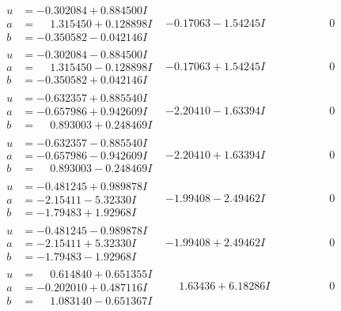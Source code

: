 \documentclass[1p]{elsarticle_modified}
\theoremstyle{definition}
\begin{document}
$$\begin{array}{c|c|c}
\begin{aligned}
u &= -0.302084 + 0.884500 I \\
a &= \phantom{-}1.315450 + 0.128898 I \\
b &= -0.350582 - 0.042146 I\end{aligned}
 & -0.17063 - 1.54245 I & \phantom{-0.000000 } 0 \\ \hline\begin{aligned}
u &= -0.302084 - 0.884500 I \\
a &= \phantom{-}1.315450 - 0.128898 I \\
b &= -0.350582 + 0.042146 I\end{aligned}
 & -0.17063 + 1.54245 I & \phantom{-0.000000 } 0 \\ \hline\begin{aligned}
u &= -0.632357 + 0.885540 I \\
a &= -0.657986 + 0.942609 I \\
b &= \phantom{-}0.893003 + 0.248469 I\end{aligned}
 & -2.20410 - 1.63394 I & \phantom{-0.000000 } 0 \\ \hline\begin{aligned}
u &= -0.632357 - 0.885540 I \\
a &= -0.657986 - 0.942609 I \\
b &= \phantom{-}0.893003 - 0.248469 I\end{aligned}
 & -2.20410 + 1.63394 I & \phantom{-0.000000 } 0 \\ \hline\begin{aligned}
u &= -0.481245 + 0.989878 I \\
a &= -2.15411 - 5.32330 I \\
b &= -1.79483 + 1.92968 I\end{aligned}
 & -1.99408 - 2.49462 I & \phantom{-0.000000 } 0 \\ \hline\begin{aligned}
u &= -0.481245 - 0.989878 I \\
a &= -2.15411 + 5.32330 I \\
b &= -1.79483 - 1.92968 I\end{aligned}
 & -1.99408 + 2.49462 I & \phantom{-0.000000 } 0 \\ \hline\begin{aligned}
u &= \phantom{-}0.614840 + 0.651355 I \\
a &= -0.202010 + 0.487116 I \\
b &= \phantom{-}1.083140 - 0.651367 I\end{aligned}
 & \phantom{-}1.63436 + 6.18286 I & \phantom{-0.000000 } 0 \\ \hline\begin{aligned}

\end{aligned}
\end{array}$$
\end{document}
